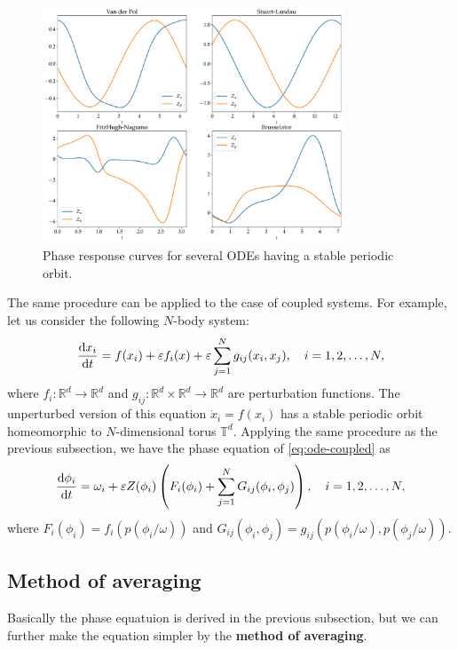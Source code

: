 \begin{figure}[htbp]
  \centering
  \includegraphics[width=0.8\textwidth]{figs/prc.pdf}
  \caption{Phase response curves for several ODEs having a stable periodic orbit.}
  \label{fig:prc}
\end{figure}

The same procedure can be applied to the case of coupled systems.
For example, let us consider the following $N$-body system:
\begin{align}
  \frac{\mathrm{d} x_{i}}{\mathrm{d} t}=f(x_{i})+\varepsilon f_{i}(x)+\varepsilon\sum_{j=1}^{N} g_{ij}(x_{i},x_{j}),\quad i=1,2,\dots,N,
  \label{eq:ode-coupled}
\end{align}
where $f_{i}\colon\mathbb{R}^{d}\to\mathbb{R}^{d}$ and $g_{ij}\colon\mathbb{R}^{d}\times\mathbb{R}^{d}\to\mathbb{R}^{d}$ are perturbation functions.
The unperturbed version of this equation $\dot{x}_{i}=f(x_{i})$ has a stable periodic orbit homeomorphic to $N$-dimensional torus $\mathbb{T}^{d}$.
Applying the same procedure as the previous subsection, we have the phase equation of \eqref{eq:ode-coupled} as
\begin{align}
  \frac{\mathrm{d}\phi_{i}}{\mathrm{d} t}=\omega_{i}+\varepsilon Z(\phi_{i})\left(F_{i}(\phi_{i})+\sum_{j=1}^{N}G_{ij}(\phi_{i},\phi_{j})\right),\quad i=1,2,\dots,N,
  \label{eq:perturbed-phase-diff-coupled}
\end{align}
where $F_{i}(\phi_{i})=f_{i}(p(\phi_{i}/\omega))$ and $G_{ij}(\phi_{i},\phi_{j})=g_{ij}(p(\phi_{i}/\omega),p(\phi_{j}/\omega))$.

\subsection{Method of averaging}
Basically the phase equatuion is derived in the previous subsection, but we can further make the equation simpler by the \textbf{method of averaging}.

